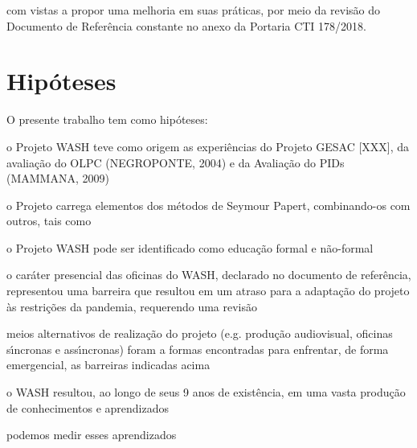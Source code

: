 \documentclass[
12pt,		%
openright,	%
twoside,  %
a4paper,			%
chapter=TITLE,		%
english,			%
french,				%
spanish,			%
brazil				%
]{USPSC-classe/USPSC_RedarTex}
\begin{document}
com vistas a propor uma melhoria em suas pr\'aticas, por meio da revis\~ao do Documento de Refer\^encia constante no anexo da Portaria CTI 178/2018.








\section[Hip\'oteses]{Hip\'oteses}\label{Hip\'oteses}
O presente trabalho tem como hip\'oteses:









\begin{alineas}
\item o Projeto WASH teve como origem as experi\^encias do Projeto GESAC [XXX], da avalia\c{c}\~ao do OLPC (NEGROPONTE, 2004) e da Avalia\c{c}\~ao do PIDs (MAMMANA, 2009)
\item o Projeto carrega elementos dos m\'etodos de Seymour Papert, combinando-os com outros, tais como
\item o Projeto WASH pode ser identificado como \textquotedbl educa\c{c}\~ao  formal e n\~ao-formal
\item o car\'ater presencial das oficinas do WASH, declarado no documento de refer\^encia, representou uma barreira que resultou em um atraso para a adapta\c{c}\~ao do projeto \`as restri\c{c}\~oes da pandemia, requerendo uma revis\~ao
\item meios alternativos de realiza\c{c}\~ao do projeto (e.g. produ\c{c}\~ao audiovisual, oficinas s\'{\i}ncronas e ass\'{\i}ncronas) foram a formas encontradas para enfrentar, de forma emergencial, as barreiras indicadas acima
\item o WASH resultou, ao longo de seus 9 anos de exist\^encia, em uma vasta produ\c{c}\~ao de conhecimentos e aprendizados
\item podemos medir  esses aprendizados 
\end{alineas}
\end{document}
